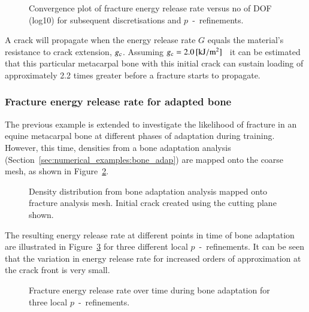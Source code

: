 \documentclass[review]{elsarticle}
\numberwithin{equation}{section}
\begin{document}
\begin{figure}[h!]
	\centering
	
	\caption{Convergence plot of fracture energy release rate versus no of DOF (log10) for subsequent discretisations and $p$~-~refinements.}
	\label{fig:max_g1_convergece}
\end{figure}
A crack will propagate when the energy release rate $G$ equals the material's resistance to crack extension, $g_{\rm c}$. Assuming $g_{\rm c} = 2.0\,[\mathrm{ kJ/m^2}]$~\citep{gasser2007numerical} it can be estimated that this particular metacarpal bone with this initial crack can sustain loading of approximately 2.2 times greater before a fracture starts to propagate. 

\subsubsection{Fracture energy release rate for adapted bone}
The previous example is extended to investigate the likelihood of fracture in an equine metacarpal bone at different phases of adaptation during training.
However, this time, densities from a bone adaptation analysis (Section~\ref{sec:numerical_examples:bone_adap}) are mapped onto the coarse mesh, as shown in Figure~\ref{fig:frackmeshcutting}. 
\begin{figure}[h]
	\centering
			\def\svgwidth{12cm}
		
	\caption{Density distribution from bone adaptation analysis mapped onto fracture analysis mesh. Initial crack created using the cutting plane shown.}
	\label{fig:frackmeshcutting}
\end{figure}
The resulting energy release rate at different points in time of bone adaptation are illustrated in Figure~\ref{fig:crackmc3release} for three different local $p$~-~refinements. It can be seen that the variation in energy release rate for increased orders of approximation at the crack front is very small. 
\begin{figure}[h!]
	\centering
	\caption{Fracture energy release rate over time during bone adaptation for three local $p$~-~refinements.}
	\label{fig:crackmc3release}
\end{figure}
\end{document}
